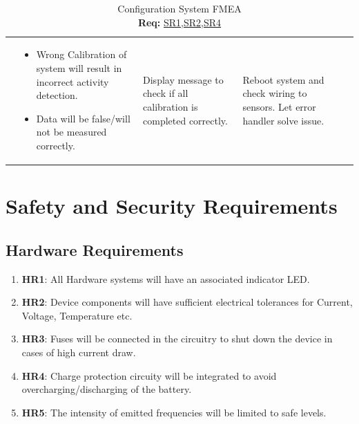 \documentclass{article}
\begin{document}
\begin{table}[H]
\begin{tabular}{|p{3em}|p{5em}|p{7em}|p{8em}|p{6em}|p{7em}|}
		 & \begin{itemize}[nosep, wide=0pt, leftmargin=*, after=\strut]
			   \item Wrong Calibration of system will result in incorrect activity detection.
			   \item Data will be false/will not be measured correctly.
		   \end{itemize}

		 & Display message to check if all calibration is completed correctly.
		 & Reboot system and check wiring to sensors. Let error handler solve issue. \tabularnewline\cline{1-6}

	\end{tabular}%
	\caption{\label{tab:Configuration}Configuration System FMEA \\\hspace{0.1\textwidth} \textbf{Req:} \hyperref[SR1]{SR1},\hyperref[SR2]{SR2},\hyperref[SR4]{SR4}}
	\end{table}



\section{Safety and Security Requirements}

\subsection{Hardware Requirements}
\begin{enumerate}
	\item\label{HR1}\textbf{HR1}: All Hardware systems will have an associated indicator LED.\\
	\item\label{HR2}\textbf{HR2}: Device components will have sufficient electrical tolerances for Current, Voltage, Temperature etc.\\
	\item\label{HR3}\textbf{HR3}: Fuses will be connected in the circuitry to shut down the device in cases of high current draw.\\
	\item\label{HR4}\textbf{HR4}: Charge protection circuity will be integrated to avoid overcharging/discharging of the battery.\\
	\item\label{HR5}\textbf{HR5}: The intensity of emitted frequencies will be limited to safe levels.\\
\end{enumerate}
\end{document}
